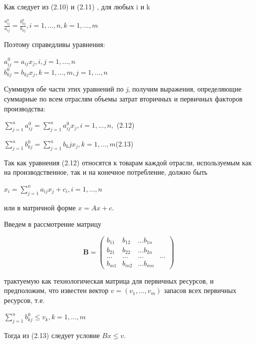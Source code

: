 \documentclass[12pt, 4paper]{book}
\begin{document}
{Как следует из (2.10) и (2.11) , для любых i и k
\begin{center}
$\frac{a_{ij}^{0}}{a_{ij}}=\frac{b_{kj}^{0}}{b_{kj}},i=1,...,n,k=1,...,m$
\end{center}
Поэтому справедливы уравнения:
\begin{center}
$a_{ij}^{0}=a_{ij}x_j , i,j=1,...,n$\\
$b_{kj}^{0}=b_{kj}x_j,k=1,...,m,j=1,...,n$
\end{center}
Суммируя обе части этих уравнений по \textit{j}, получим выражения, определяющие суммарные по всем отраслям объемы затрат вторичных и первичных факторов производства:
\begin{center}
$\sum\limits_{j=1}^{n}a_{ij}^{0} = \sum\limits_{j=1}^{n}a_{ij}^{0}x_j, i=1,...,n,$ (2.12)
\end{center}
\begin{center}
$\sum\limits_{j=1}^{n}b_{kj}^{0}=\sum\limits_{j=1}^{n}b_kjx_j, k=1,...,m$(2.13)
\end{center}
\par

Так как уравнения (2.12) относятся к товарам каждой отрасли, используемым как на производственное, так и на конечное потребление, должно быть
\begin{center}
$x_i = \sum\limits_{j=1}^{n}a_{ij}x_j + c_i,i=1,...,n$
\end{center}
или в матричной форме $x = Ax+c$.
\par

Введем в рассмотрение матрицу
\begin{center}
\begin{displaymath}
\mathbf{B} =
\left( \begin{array}{cccc}
b_{11} & b_{12} & \ldots b_{1n} \\
b_{21} & b_{22} & \ldots b_{2n} \\
\ldots & \ldots & \ldots & \ldots \\
b_{m1} & b_{m2} & \ldots b_{mn} 
\end{array} \right)
\end{displaymath}
\end{center}
трактуемую как технологическая матрица для первичных ресурсов, и предположим, что известен вектор $v=(v_1,...,v_m)$ запасов всех первичных ресурсов, т.е.
\begin{center}
$\sum\limits_{j=1}^{n}b_{kj}^{0} \leq v_k ,k=1,...,m$
\end{center}
Тогда из (2.13) следует условие $Bx \leq v$.
\par

}
\end{document}
